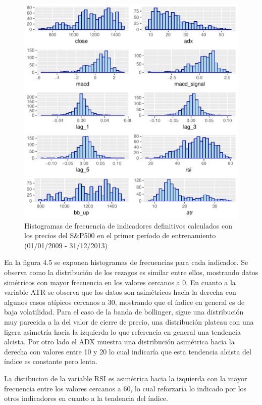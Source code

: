 \documentclass[a4paper,12pt]{Latex/Classes/PhDthesisPSnPDF}
\begin{document}
\begin{figure}[H]
\centering
\includegraphics{main-010}
\caption{Histogramas de frecuencia de indicadores definitivos calculados con los precios del S\&P500 en el primer período de entrenamiento (01/01/2009 - 31/12/2013)}
\end{figure}

En la figura 4.5 se exponen histogramas de frecuencias para cada indicador. Se observa como la distribución de los rezagos es similar entre ellos, mostrando datos simétricos con mayor frecuencia en los valores cercanos a 0. En cuanto a la variable ATR se observa que los datos son asimétricos hacia la derecha con algunos casos atípicos cercanos a 30, mostrando que el índice en general es de baja volatilidad. Para el caso de la banda de bollinger, sigue una distribución muy parecida a la del valor de cierre de precio, una distribución plateau con una ligera asimetría hacia la izquierda lo que referencia en general una tendencia alcista. Por otro lado el ADX muestra una distribución asimétrica hacia la derecha con valores entre 10 y 20 lo cual indicaría que esta tendencia alcista del índice es constante pero lenta. 

La distibucion de la variable RSI es asimétrica hacia la izquierda con la mayor frecuencia entre los valores cercanos a 60, lo cual reforzaría lo indicado por los otros indicadores en cuanto a la tendencia del índice.
\end{document}
